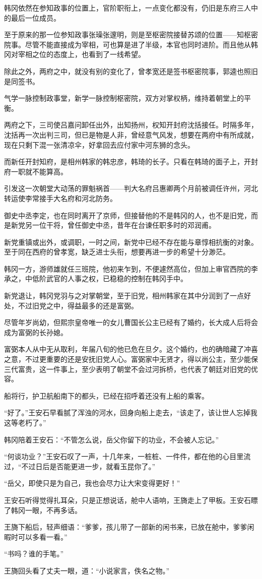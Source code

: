 韩冈依然在参知政事的位置上，官阶职衔上，一点变化都没有，仍旧是东府三人中的最后一位成员。

至于原来的那一位参知政事张璪张邃明，则是至枢密院接替苏颂的位置——知枢密院事。尽管不能直接成为宰相，可也算是进了半级，本官也同时进阶。而且他从韩冈对宰相之位的态度上，也看到了一线希望。

除此之外，两府之中，就没有别的变化了，曾孝宽还是签书枢密院事，郭逵也照旧是同签书。

气学一脉控制政事堂，新学一脉控制枢密院，双方对掌权柄，维持着朝堂上的平衡。

两府之下，三司使吕嘉问卸任出外，出知扬州，权知开封府沈括接任。时隔多年，沈括再一次出判三司，但已是物是人非，曾经意气风发，想要在两府中有所成就，现在只剩下混一张清凉伞，好拿回去应付家中河东狮的念头。

而新任开封知府，是相州韩家的韩忠彦，韩琦的长子。只看在韩琦的面子上，开封府一职就不能算高。

引发这一次朝堂大动荡的罪魁祸首——判大名府吕惠卿两个月前被调任许州，河北转运使李常接手大名府和河北防务。

御史中丞李定，也在同时离开了京师，但接替他的不是韩冈的人，也不是旧党，而是新党另一位干将，曾任御史中丞，昔年在台谏任职多时的邓润甫。

新党重镇或出外，或调职，一时之间，新党中已经不存在能与章惇相抗衡的对象。至于同在西府的曾孝宽，缺乏进士头衔，想要再进一步的希望十分渺茫。

韩冈一方，游师雄就任三班院，他初来乍到，不便遽然高位，但加上审官西院的李承之，中低阶武官的人事之权，已稳稳的控制在韩冈手中。

新党退让，韩冈党羽与之对掌朝堂，至于旧党，相州韩家在其中分润到了一点好处，不过旧党之中，得益最多的还是富弼。

尽管年岁尚幼，但熙宗皇帝唯一的女儿曹国长公主已经有了婚约，长大成人后将会成为富弼的长孙媳。

富弼本人从中无从取利，年届八旬的他已危在旦夕。这个婚约，也的确暗藏了冲喜之意，不过更重要的还是安抚旧党人心。富弼家中无贤才，得以尚公主，至少能保三代富贵，这一件事上，至少表明了朝堂不会过河拆桥，也代表了朝廷对旧党的优容。

船将行，护卫航船南下的都头，已经在招呼着还没有上船的乘客。

“好了。”王安石早看腻了浑浊的河水，回身向船上走去，“该走了，该让世人忘掉我这等老朽了。”

韩冈陪着王安石：“不管怎么说，岳父你留下的功业，不会被人忘记。”

“何谈功业？”王安石叹了一声，十几年来，一桩桩、一件件，都在他的心目里流过，“不过日后是否能更进一步，就看玉昆你了。”

“岳父，即使只是为自己，我也会尽力让大宋变得更好！”

王安石听得觉得扎耳朵，只是正想说话，舱中人语响，王旖走上了甲板。王安石瞟了韩冈一眼，不再多话。

王旖下船后，轻声细语：“爹爹，孩儿带了一部新的闲书来，已放在舱中，爹爹闲暇时可以多看一看。”

“书吗？谁的手笔。”

王旖回头看了丈夫一眼，道：“小说家言，佚名之物。”

